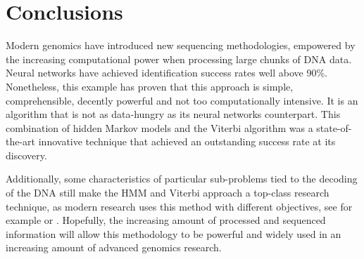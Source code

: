 \documentclass[a4paper, 11pt]{article} %
\begin{document}
\section*{Conclusions}

Modern genomics have introduced new sequencing methodologies, empowered by the increasing computational power when processing large chunks of DNA data. Neural networks have achieved identification success rates well above 90\%. Nonetheless, this example has proven that this approach is simple, comprehensible, decently powerful and not too computationally intensive. It is an algorithm that is not as data-hungry as its neural networks counterpart. This combination of hidden Markov models and the Viterbi algorithm was a state-of-the-art innovative technique that achieved an outstanding success rate at its discovery.

Additionally, some characteristics of particular sub-problems tied to the decoding of the DNA still make the HMM and Viterbi approach a top-class research technique, as modern research uses this method with different objectives, see for example \cite{schreiber} or \cite{sacher}. Hopefully, the increasing amount of processed and sequenced information will allow this methodology to be powerful and widely used in an increasing amount of advanced genomics research.


\medskip

\end{document}
